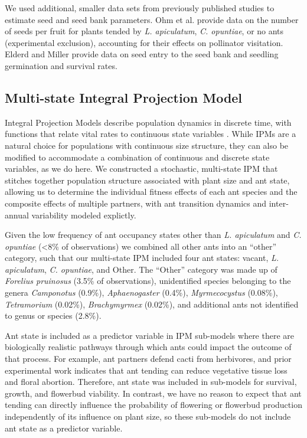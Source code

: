 \documentclass[11pt]{article}
\begin{document}
We used additional, smaller data sets from previously published studies to estimate seed and seed bank parameters. 
Ohm et al. \citeyear{Ohm2014} provide data on the number of seeds per fruit for plants tended by \textit{L. apiculatum}, \textit{C. opuntiae}, or no ants (experimental exclusion), accounting for their effects on pollinator visitation. 
Elderd and Miller \citeyear{elderd2016quantifying} provide data on seed entry to the seed bank and seedling germination and survival rates. 


\subsection*{Multi-state Integral Projection Model}
Integral Projection Models describe population dynamics in discrete time, with functions that relate vital rates to continuous state variables \citep{ellnerbook}. 
While IPMs are a natural choice for populations with continuous size structure, they can also be modified to accommodate a combination of continuous and discrete state variables, as we do here. 
We constructed a stochastic, multi-state IPM that stitches together population structure associated with plant size and ant state, allowing us to determine the individual fitness effects of each ant species and the composite effects of multiple partners, with ant transition dynamics and inter-annual variability modeled explictly. 

Given the low frequency of ant occupancy states other than \textit{L. apiculatum} and \textit{C. opuntiae} (\textless8\% of observations) we combined all other ants into an ``other'' category, such that our multi-state IPM included four ant states: vacant, \textit{L. apiculatum}, \textit{C. opuntiae}, and Other. 
The ``Other'' category was made up of \textit{Forelius pruinosus} (3.5\% of observations), unidentified species belonging to the genera \textit{Camponotus} (0.9\%), \textit{Aphaenogaster} (0.4\%), \textit{Myrmecocystus} (0.08\%), \textit{Tetramorium} (0.02\%), \textit{Brachymyrmex} (0.02\%), and additional ants not identified to genus or species (2.8\%). 

Ant state is included as a predictor variable in IPM sub-models where there are biologically realistic pathways through which ants could impact the outcome of that process. 
For example, ant partners defend cacti from herbivores, and prior experimental work indicates that ant tending can reduce vegetative tissue loss and floral abortion.
Therefore, ant state was included in sub-models for survival, growth, and flowerbud viability. 
In contrast, we have no reason to expect that ant tending can directly influence the probability of flowering or flowerbud production independently of its influence on plant size, so these sub-models do not include ant state as a predictor variable. 
\end{document}

